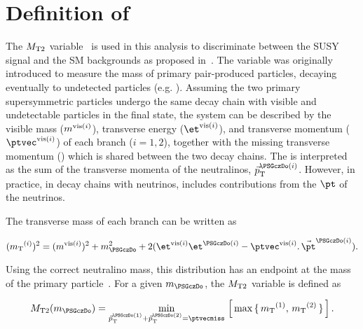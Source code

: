 \section{\texorpdfstring{Definition of \mttwo}{Definition of MT2}}
\label{sect:mt2def}
The ${M_{\rm T2}}$ variable~\cite{Lester:1999tx,Barr:2003rg} is used in this analysis to discriminate between the SUSY signal and the SM backgrounds as proposed in~\cite{Barr:2009wu}. The variable was originally introduced to measure the mass of primary pair-produced particles, decaying eventually to undetected particles (e.g. \PSGczDo). Assuming the two primary supersymmetric particles undergo the same decay chain with visible and undetectable particles in the final state, the system can be described by the visible mass ($m^{{\rm vis}(i)}$), transverse energy ($\etvisi$), and transverse momentum ($\vptvisi$) of each branch ($i=1,2$), together with the 
missing transverse momentum (\ptvecmiss) which is shared between the two decay chains. The \ptvecmiss is interpreted as the sum of the transverse momenta
of the neutralinos, $\vec{p}_{\rm T}^{\PSGczDo(i)}$.
However, in practice, in decay chains with neutrinos, \ptvecmiss includes contributions from the $\pt$ of the neutrinos.

The transverse mass of each branch can be written as 
\begin{linenomath}
\begin{equation}
\label{eq:mtdef}
(\mt^{(i)})^{2}= (\mvisi)^2+m^2_{\PSGczDo}+2(\etvisi\et^{\PSGczDo(i)}-{\vptvisi}.\,{\vec{\pt}^{\PSGczDo(i)}}).
\end{equation}
\end{linenomath}

\noindent Using the correct neutralino mass, this distribution has an endpoint at the mass of the primary particle~\cite{Arnison:1983rp,Banner:1983jy,Affolder:2000bpa,Abazov:2002bu}. 
For a given $m_{\PSGczDo}$, the ${M_{\rm T2}}$ variable is defined as
\begin{linenomath}
\begin{equation}
\label{eq:mt2def}
\mttwo(m_{\PSGczDo})= \min_{\vec{p}_{\rm T}^{\PSGczDo(1)}+\vec{p}_{\rm T}^{\PSGczDo(2)}=\ptvecmiss}\,\left[\,\max\,\{ \, \mt^{(1)},\,\mt^{(2)}\,\}\,\right].
\end{equation}
\end{linenomath}

